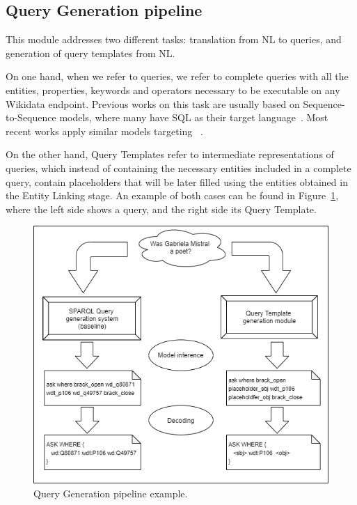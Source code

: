 \subsection{Query Generation pipeline}
\label{cap3:system/queryGenModule/pipeline}
This module addresses two different tasks: translation from NL to \SPARQL{} queries, and 
generation of query templates from NL. 

On one hand, when we refer to \SPARQL{} queries, we refer to complete queries with all the 
entities, properties, \SPARQL{} keywords and operators necessary to be executable on any 
Wikidata endpoint. Previous works on this task are usually based on Sequence-to-Sequence 
models, where many have SQL as their target language~\cite{nmt:DongL16, nmt:CaiXZYLL18, 
nmt:ZhongCoRR17}. Most recent works apply similar models targeting \SPARQL{}~\cite{nmt:CoRRLuz18, 
nmt:nspm-SoruMMPVEN17, nmt:CoRRSoru18}.

On the other hand, Query Templates refer to intermediate representations of \SPARQL{} queries, 
which instead of containing the necessary entities included in a complete \SPARQL{} query, 
contain placeholders that will be later filled using the entities obtained in the Entity 
Linking stage. An example of both cases can be found in Figure~\ref{fig:queryGenerationOverview}, 
where the left side shows a \SPARQL{} query, and the right side its Query Template. 

\begin{figure}[!h]
    \centering
    \includegraphics[scale=.5]{imagenes/3_system_overview/queryGenerationPipeline.png}
    \caption{Query Generation pipeline example.}
    \label{fig:queryGenerationOverview}
\end{figure}

